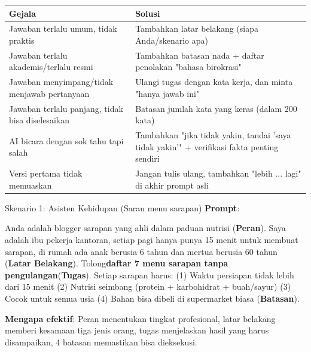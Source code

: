 
\begin{center}
\begin{tabularx}{\linewidth}{|X|X|}
\hline
\textbf{Gejala} & \textbf{Solusi} \tabularnewline
\hline
Jawaban terlalu umum, tidak praktis & Tambahkan latar belakang (siapa Anda/skenario apa) \tabularnewline
Jawaban terlalu akademis/terlalu resmi & Tambahkan batasan nada + daftar penolakan "bahasa birokrasi" \tabularnewline
Jawaban menyimpang/tidak menjawab pertanyaan & Ulangi tugas dengan kata kerja, dan minta "hanya jawab ini" \tabularnewline
Jawaban terlalu panjang, tidak bisa diselesaikan & Batasan jumlah kata yang keras (dalam 200 kata) \tabularnewline
AI bicara dengan sok tahu tapi salah & Tambahkan "jika tidak yakin, tandai 'saya tidak yakin'" + verifikasi fakta penting sendiri \tabularnewline
Versi pertama tidak memuaskan & Jangan tulis ulang, tambahkan "lebih ... lagi" di akhir prompt asli \tabularnewline
\hline
\end{tabularx}
\end{center}


\begin{tcbinfo}{Skenario 1: Asisten Kehidupan (Saran menu sarapan)}
\textbf{Prompt}:

Anda adalah blogger sarapan yang ahli dalam paduan nutrisi (\textbf{Peran}). Saya adalah ibu pekerja kantoran, setiap pagi hanya punya 15 menit untuk membuat sarapan, di rumah ada anak berusia 6 tahun dan mertua berusia 60 tahun (\textbf{Latar Belakang}). Tolong\textbf{daftar 7 menu sarapan tanpa pengulangan}(\textbf{Tugas}). Setiap sarapan harus: (1) Waktu persiapan tidak lebih dari 15 menit (2) Nutrisi seimbang (protein + karbohidrat + buah/sayur) (3) Cocok untuk semua usia (4) Bahan bisa dibeli di supermarket biasa (\textbf{Batasan}).

\textbf{Mengapa efektif}: Peran menentukan tingkat profesional, latar belakang memberi kesamaan tiga jenis orang, tugas menjelaskan hasil yang harus disampaikan, 4 batasan memastikan bisa dieksekusi.

\end{tcbinfo}

